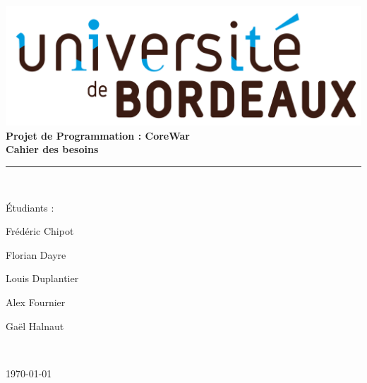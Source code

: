 \begin{titlepage}
 \begin{sffamily}
  \begin{center}
            \includegraphics[scale=0.04]{Images/ubx-logo.png}
            \\[2cm]
        
    
    {\huge \bfseries  Projet de Programmation : CoreWar \\ Cahier des besoins\\ [0.5cm] }

    \rule{\linewidth}{.5pt}
    \\[2cm]

    \begin{minipage}{0.4\textwidth}
      \begin{flushleft} \large
        \author{}Étudiants : \item Frédéric Chipot \item Florian Dayre \item Louis Duplantier \item Alex Fournier \item Gaël Halnaut
            
      \end{flushleft}
    \end{minipage}
    \begin{minipage}{0.4\textwidth}
      \begin{flushright} \large
        \emph{}\\  \textsc{}
      \end{flushright}
    \end{minipage}

    \vfill

    {\large \today}

  \end{center}
  \end{sffamily}
  
\end{titlepage}